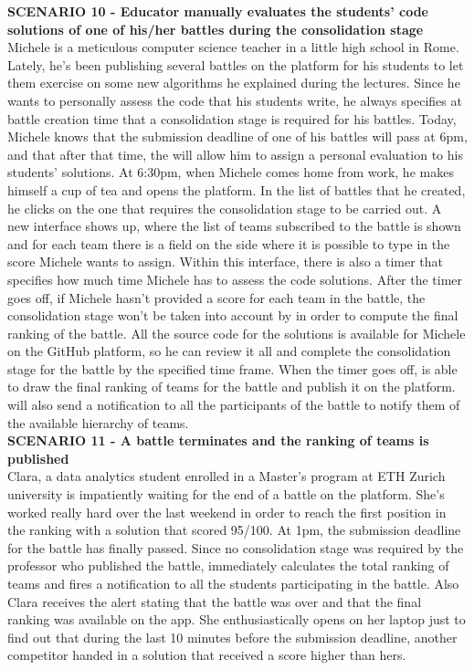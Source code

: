     \textbf{SCENARIO 10 - Educator manually evaluates the students' code solutions of one of his/her battles during the consolidation stage}\\
    Michele is a meticulous computer science teacher in a little high school in Rome. Lately, he's been publishing several battles on the \app platform for his students to let them exercise on some new algorithms he explained during the lectures. Since he wants to personally assess the code that his students write, he always specifies at battle creation time that a consolidation stage is required for his battles. Today, Michele knows that the submission deadline of one of his battles will pass at 6pm, and that after that time, the \app will allow him to assign a personal evaluation to his students' solutions. At 6:30pm, when Michele comes home from work, he makes himself a cup of tea and opens the \app platform. In the list of battles that he created, he clicks on the one that requires the consolidation stage to be carried out. A new interface shows up, where the list of teams subscribed to the battle is shown and for each team there is a field on the side where it is possible to type in the score Michele wants to assign. Within this interface, there is also a timer that specifies how much time Michele has to assess the code solutions. After the timer goes off, if Michele hasn't provided a score for each team in the battle, the consolidation stage won't be taken into account by \app in order to compute the final ranking of the battle.
    All the source code for the solutions is available for Michele on the GitHub platform, so he can review it all and complete the consolidation stage for the battle by the specified time frame.
    When the timer goes off, \app is able to draw the final ranking of teams for the battle and publish it on the platform. \app will also send a notification to all the participants of the battle to notify them of the available hierarchy of teams.\\

	\textbf{SCENARIO 11 - A battle terminates and the ranking of teams is published}\\
	Clara, a data analytics student enrolled in a Master's program at ETH Zurich university is impatiently waiting for the end of a battle on the \app platform. She's worked really hard over the last weekend in order to reach the first position in the ranking with a solution that scored 95/100. At 1pm, the submission deadline for the battle has finally passed. Since no consolidation stage was required by the professor who published the battle, \app immediately calculates the total ranking of teams and fires a notification to all the students participating in the battle. Also Clara receives the alert stating that the battle was over and that the final ranking was available on the app. She enthusiastically opens \app on her laptop just to find out that during the last 10 minutes before the submission deadline, another competitor handed in a solution that received a score higher than hers.\\ 

